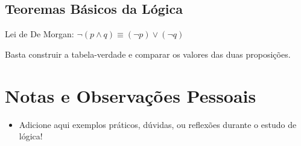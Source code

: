 \subsection{Teoremas Básicos da Lógica}
\begin{theorembox}
Lei de De Morgan: $\neg(p \land q) \equiv (\neg p) \lor (\neg q)$
\end{theorembox}

\begin{proofbox}
Basta construir a tabela-verdade e comparar os valores das duas proposições.
\end{proofbox}

\section{Notas e Observações Pessoais}
\begin{itemize}[leftmargin=1.5em]
    \item Adicione aqui exemplos práticos, dúvidas, ou reflexões durante o estudo de lógica!
\end{itemize}
